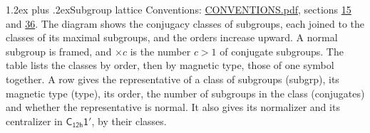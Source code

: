 \documentclass[10pt,a4paper]{article}
\makeatletter
\renewcommand\section{\@startsection{section}{1}{\z@}{-3ex plus -1ex minus -.2ex}%
  {1.2ex plus .2ex}{\normalfont\large\sffamily\bfseries\color{parttitle}}}
\numberwithin{equation}{section}
\newcommand{\grp}[1]{\mathsf{#1}}
\makeatother
\begin{document}
\section{Subgroup lattice}\label{s:subgroups}
Conventions: \href{../../CONVENTIONS.pdf}{CONVENTIONS.pdf}, sections \href{../../../rotation/CONVENTIONS.pdf\#conv.15}{15} and \href{../../CONVENTIONS.pdf\#conv.36}{36}.
The diagram shows the conjugacy classes of subgroups, each joined to the classes of its maximal subgroups, and the orders increase upward. \label{n:index.conjugates.c}A normal subgroup is framed, and ${\times}c$ is the number $c > 1$ of conjugate subgroups. The table lists the classes by order, then by magnetic type, those of one symbol together. \label{n:head.subgroup}\label{n:head.magnetic.type}\label{n:head.order}\label{n:head.conjugates}\label{n:head.normal}A row gives the representative of a class of subgroups (subgrp), its magnetic type (type), its order, the number of subgroups in the class (conjugates) and whether the representative is normal. \label{n:head.normalizer}\label{n:head.centralizer}It also gives its normalizer and its centralizer in $\grp{C_{12h}1'}$, by their classes. 
\end{document}
